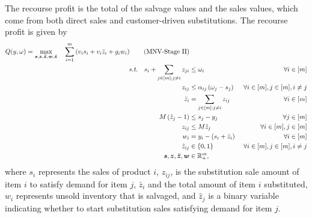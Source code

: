     The recourse profit is the total of the salvage values and the sales values, which come from both direct sales and customer-driven substitutions. The recourse profit is given by
        \begin{align}\label{eq:mnv_secondstage}
        Q(y, \omega) = \max_{\boldsymbol{s}, \boldsymbol{z}, \boldsymbol{\bar{z}}, \boldsymbol{w}, \boldsymbol{\hat{z}}} \quad \sum_{i=1}^m \left( v_i s_i + v_i \bar{z}_i + g_i w_i \right)  \tag{MNV-Stage II} \\
        \textit{s.t.} \quad s_i + \sum_{j \in [m] :j \neq i} z_{ji} &\leq \omega_i & \forall i \in [m]  \notag \\
        \quad z_{ij} &\leq \alpha_{ij} \left( \omega_j - s_j \right) & \forall i \in [m], j \in [m], i \neq j  \notag \\
        \quad \bar{z}_i &= \sum_{j \in [m]:j \neq i} z_{ij} & \forall i \in [m]  \notag \\
        \quad M \left( \hat{z}_j - 1 \right) &\leq s_j - y_j & \forall j \in [m]  \notag \\
        \quad z_{ij} &\leq M \hat{z}_j & \forall i \in [m], j \in [m]  \notag \\
        \quad w_i &= y_i - \left( s_i + \bar{z}_i \right) & \forall i \in [m]  \notag \\
        \quad \hat{z}_{ij} &\in \{0, 1\} &\ \forall i \in [m], j \in [m],  i \neq j \notag \\
        \quad \boldsymbol{s}, \boldsymbol{z}, \boldsymbol{\bar{z}}, \boldsymbol{w} &\in \mathbb{R}^m_+, \notag
        \end{align} 
where \(s_i\) represents the sales of product $i$, \(z_{ij}\), is the substitution sale amount of item $i$ to satisfy demand for item $j$, \(\bar{z}_i\) and the total amount of item $i$ substituted, \(w_i\) represents unsold inventory that is salvaged, and $\hat{z}_j$ is a binary variable indicating whether to start substitution sales satisfying demand for item $j$. 


